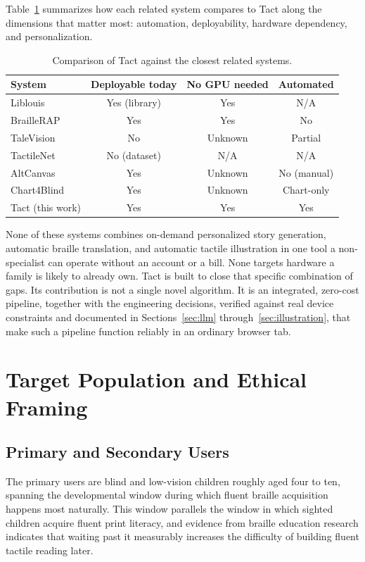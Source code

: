 \documentclass[conference]{IEEEtran}
\begin{document}
Table~\ref{tab:relatedwork} summarizes how each related system compares to Tact along the dimensions that matter most: automation, deployability, hardware dependency, and personalization.

\begin{table}[t]
\caption{Comparison of Tact against the closest related systems.}
\label{tab:relatedwork}
\centering
\begin{tabular}{lccc}
\toprule
System & Deployable today & No GPU needed & Automated \\
\midrule
Liblouis \cite{liblouis} & Yes (library) & Yes & N/A \\
BrailleRAP \cite{braillerap} & Yes & Yes & No \\
TaleVision \cite{talevision} & No & Unknown & Partial \\
TactileNet \cite{tactilenet} & No (dataset) & N/A & N/A \\
AltCanvas \cite{altcanvas} & Yes & Unknown & No (manual) \\
Chart4Blind \cite{chart4blind} & Yes & Unknown & Chart-only \\
Tact (this work) & Yes & Yes & Yes \\
\bottomrule
\end{tabular}
\end{table}

None of these systems combines on-demand personalized story generation, automatic braille translation, and automatic tactile illustration in one tool a non-specialist can operate without an account or a bill. None targets hardware a family is likely to already own. Tact is built to close that specific combination of gaps. Its contribution is not a single novel algorithm. It is an integrated, zero-cost pipeline, together with the engineering decisions, verified against real device constraints and documented in Sections~\ref{sec:llm} through~\ref{sec:illustration}, that make such a pipeline function reliably in an ordinary browser tab.

\section{Target Population and Ethical Framing}\label{sec:population}

\subsection{Primary and Secondary Users}

The primary users are blind and low-vision children roughly aged four to ten, spanning the developmental window during which fluent braille acquisition happens most naturally. This window parallels the window in which sighted children acquire fluent print literacy, and evidence from braille education research indicates that waiting past it measurably increases the difficulty of building fluent tactile reading later.
\end{document}
